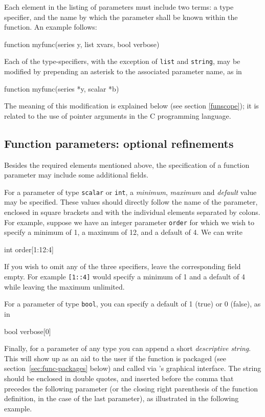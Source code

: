 Each element in the listing of parameters must include two terms: a
type specifier, and the name by which the parameter shall be known
within the function.  An example follows:
%    
\begin{code}
function myfunc(series y, list xvars, bool verbose)
\end{code}

Each of the type-specifiers, with the exception of \texttt{list} and
\texttt{string}, may be modified by prepending an asterisk to the
associated parameter name, as in
%    
\begin{code}
function myfunc(series *y, scalar *b)
\end{code}

The meaning of this modification is explained below (see section
\ref{funscope}); it is related to the use of pointer arguments in the
C programming language.

\subsection{Function parameters: optional refinements}

Besides the required elements mentioned above, the specification of a
function parameter may include some additional fields.

For a parameter of type \texttt{scalar} or \texttt{int}, a
\textsl{minimum}, \textsl{maximum} and \textsl{default} value may be
specified.  These values should directly follow the name of the
parameter, enclosed in square brackets and with the individual
elements separated by colons.  For example, suppose we have an integer
parameter \texttt{order} for which we wish to specify a minimum of 1,
a maximum of 12, and a default of 4.  We can write
%    
\begin{code}
int order[1:12:4]
\end{code} 
%
If you wish to omit any of the three specifiers, leave the
corresponding field empty.  For example \texttt{[1::4]} would specify
a minimum of 1 and a default of 4 while leaving the maximum
unlimited.  

For a parameter of type \texttt{bool}, you can specify a default of
1 (true) or 0 (false), as in
%    
\begin{code}
bool verbose[0]
\end{code} 
%

Finally, for a parameter of any type you can append a short
\textsl{descriptive string}.  This will show up as an aid to the user
if the function is packaged (see section~\ref{sec:func-packages}
below) and called via 's graphical interface.  The string
should be enclosed in double quotes, and inserted before the comma
that precedes the following parameter (or the closing right
parenthesis of the function definition, in the case of the last
parameter), as illustrated in the following example.

